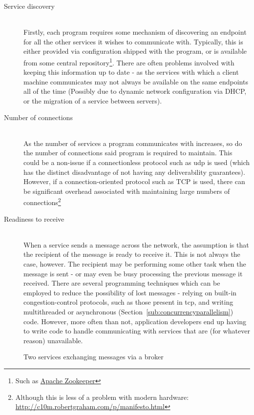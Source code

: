 \begin{description}
  \item[Service discovery] \hfill \\
  Firstly, each program requires some mechanism of discovering an endpoint for
  all the other services it wishes to communicate with. Typically, this is
  either provided via configuration shipped with the program, or is available
  from some central repository\footnote{Such as
  \href{https://zookeeper.apache.org/}{Apache Zookeeper}}. There are often
  problems involved with keeping this information up to date - as the services
  with which a client machine communicates may not always be available on the
  same endpoints all of the time (Possibly due to dynamic network configuration
  via DHCP, or the migration of a service between servers).
  \item[Number of connections] \hfill \\
  As the number of services a program communicates with increases, so do the
  number of connections said program is required to maintain. This could be a
  non-issue if a connectionless protocol such as \gls{udp} is used (which has
  the distinct disadvantage of not having any deliverability guarantees).
  However, if a connection-oriented protocol such as TCP is used, there can be
  significant overhead associated with maintaining large numbers of
  connections\footnote{Although this is less of a problem with modern hardware:
  \url{http://c10m.robertgraham.com/p/manifesto.html}}
  \item[Readiness to receive] \hfill \\
  When a service sends a message across the network, the assumption is that the
  recipient of the message is ready to receive it.  This is not always the case,
  however. The recipient may be performing some other task when the message is
  sent - or may even be busy processing the previous message it received. There
  are several programming techniques which can be employed to reduce the
  possibility of lost messages - relying on built-in congestion-control
  protocols, such as those present in \gls{tcp}\cite{rfc2581}, and writing
  multithreaded or asynchronous (Section~\ref{sub:concurrencyparallelism}) code.
  However, more often than not, application developers end up having to write
  code to handle communicating with services that are (for whatever reason)
  unavailable.
\end{description}

\begin{figure}[htbp]
  \centering
  
  \caption{Two services exchanging messages via a broker}
  \label{fig:tikz:messageBroker}
\end{figure}

